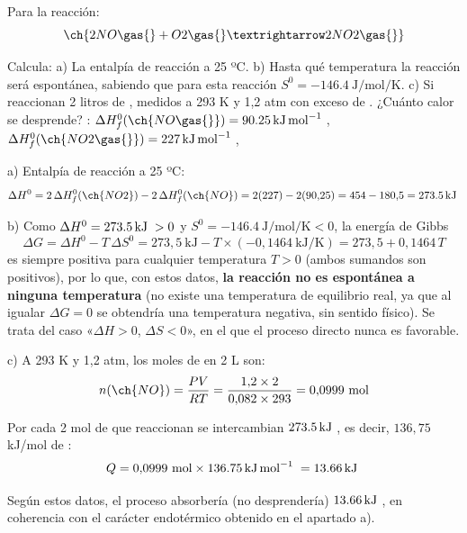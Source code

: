 \begin{exercise}
    Para la reacción:
    \begin{equation*}
        \ch{2 NO \gas{} + O2 \gas{} → 2 NO2 \gas{}}
    \end{equation*}

    Calcula: a) La entalpía de reacción a 25 ºC. b) Hasta qué temperatura la reacción será espontánea, sabiendo que para esta reacción \(S^0 = \SI{-146.4}{\joule\per\mole\per\kelvin}\). c) Si reaccionan 2 litros de , medidos a 293 K y 1,2 atm con exceso de . ¿Cuánto calor se desprende? \datos{}: \(\Delta H^0_f (\ch{NO \gas{}}) = \energia[kjmol]{90.25}\), \(\Delta H^0_f (\ch{NO2 \gas{}}) = \energia[kjmol]{227}\), \ctegases{}


    \begin{solu}


        a) Entalpía de reacción a 25 ºC:
        \[
            \Delta H^0 = 2\,\Delta H^0_f(\ch{NO2}) - 2\,\Delta H^0_f(\ch{NO}) = 2(227) - 2(90{,}25) = 454-180{,}5 = \energia[kj]{273,5}
        \]

        b) Como \(\Delta H^0 = \energia[kj]{273,5} > 0\) y \(S^0 = \SI{-146,4}{\joule\per\mole\per\kelvin} < 0\), la energía de Gibbs
        \[
            \Delta G = \Delta H^0 - T\,\Delta S^0 = 273{,}5\ \text{kJ} - T \times (-0{,}1464\ \text{kJ/K}) = 273{,}5 + 0{,}1464\,T
        \]
        es siempre positiva para cualquier temperatura \(T>0\) (ambos sumandos son positivos), por lo que, con estos datos, \textbf{la reacción no es espontánea a ninguna temperatura} (no existe una temperatura de equilibrio real, ya que al igualar \(\Delta G=0\) se obtendría una temperatura negativa, sin sentido físico). Se trata del caso «\(\Delta H>0\), \(\Delta S<0\)», en el que el proceso directo nunca es favorable.

        c) A 293 K y 1,2 atm, los moles de  en 2 L son:
        \[
            n(\ch{NO}) = \frac{PV}{RT} = \frac{1{,}2 \times 2}{0{,}082 \times 293} = 0{,}0999\ \text{mol}
        \]

        Por cada 2 mol de  que reaccionan se intercambian \(\energia[kj]{273,5}\), es decir, \(136{,}75\) kJ/mol de :
        \[
            Q = 0{,}0999\ \text{mol} \times \energia[kjmol]{136,75} = \energia[kj]{13,66}
        \]

        Según estos datos, el proceso absorbería (no desprendería) \(\energia[kj]{13,66}\), en coherencia con el carácter endotérmico obtenido en el apartado a).
    \end{solu}
\end{exercise}

